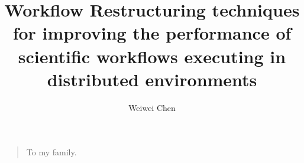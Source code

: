  



\title{Workflow Restructuring techniques for improving the performance of scientific workflows executing in distributed environments}
\author{Weiwei Chen}
\maketitle

  \begin{quote}
  To my family.
  \end{quote}

%

\newpage
\tableofcontents
\newpage
\listoftables
\newpage
\listoffigures


  

\mainmatter


















